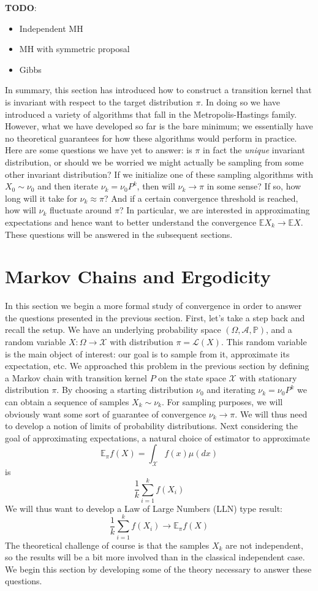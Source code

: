 \documentclass[12pt]{article}
\newcommand{\E}{\mathbb{E}}
\newcommand{\Prob}{\mathbb{P}}
\begin{document}
\textbf{TODO}: 
\begin{itemize} 
\item Independent MH
\item MH with symmetric proposal 
\item Gibbs 
\end{itemize}

In summary, this section has introduced how to construct a transition kernel that is invariant with respect to the target distribution $\pi$. In doing so we have introduced 
a variety of algorithms that fall in the Metropolis-Hastings family. However, what we have developed so far is the bare minimum; we essentially have no theoretical guarantees
for how these algorithms would perform in practice. Here are some questions we have yet to answer: is $\pi$ in fact the \textit{unique} invariant distribution, or should we be worried
we might actually be sampling from some other invariant distribution? If we initialize one of these sampling algorithms with $X_0 \sim \nu_0$ and then iterate 
$\nu_{k} = \nu_0 P^k$, then will $\nu_k \to \pi$ in some sense? If so, how long will it take for $\nu_k \approx \pi$? And if a certain convergence threshold is reached, how will 
$\nu_k$ fluctuate around $\pi$? In particular, we are interested in approximating expectations and hence want to better understand the convergence
$\E X_k \to \E X$. These questions will be answered in the subsequent sections. 

\section{Markov Chains and Ergodicity}
In this section we begin a more formal study of convergence in order to answer the questions presented in the previous section. First, let's take a step 
back and recall the setup. We have an underlying probability space $(\Omega, \mathcal{A}, \Prob)$, and a random variable $X: \Omega \to \mathcal{X}$
with distribution $\pi = \mathcal{L}(X)$. This random variable is the main object of interest: our goal is to sample from it, approximate its expectation, 
etc. We approached this problem in the previous section by defining a Markov chain with transition kernel $P$ on the state space $\mathcal{X}$ with stationary distribution 
$\pi$. By choosing a starting distribution $\nu_0$ and iterating $\nu_k = \nu_0 P^k$ we can obtain a sequence of samples $X_k \sim \nu_k$. For sampling purposes, 
we will obviously want some sort of guarantee of convergence $\nu_k \to \pi$. We will thus need to develop a notion of limits of probability distributions. 
Next considering the goal of 
approximating expectations, a natural choice of estimator to approximate
\[\E_\pi f(X) = \int_{\mathcal{X}} f(x) \mu(dx)\]
is 
\[\frac{1}{k} \sum_{i = 1}^{k} f(X_i)\]
We will thus want to develop a Law of Large Numbers (LLN) type result: 
\[\frac{1}{k} \sum_{i = 1}^{k} f(X_i) \to \E_\pi f(X)\]
The theoretical challenge of course is that the samples $X_k$ are not independent, so the results will be a bit more involved than in the classical independent 
case. We begin this section by developing some of the theory necessary to answer these questions. 
\end{document}
